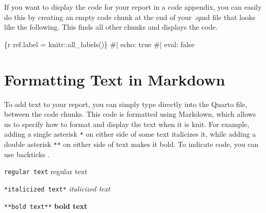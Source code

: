 \documentclass[
  letterpaper,
]{latex/krantz}
\makeatletter
\newenvironment{Shaded}{\begin{snugshade}}{\end{snugshade}}
\newcommand{\InformationTok}[1]{\textcolor[rgb]{0.37,0.37,0.37}{#1}}
\newenvironment{kframe}{%
\medskip{}
\setlength{\fboxsep}{.8em}
 \def\at@end@of@kframe{}%
 \ifinner\ifhmode%
  \def\at@end@of@kframe{\end{minipage}}%
  \begin{minipage}{\columnwidth}%
 \fi\fi%
 \def\FrameCommand##1{\hskip\@totalleftmargin \hskip-\fboxsep
 \colorbox{shadecolor}{##1}\hskip-\fboxsep
     \hskip-\linewidth \hskip-\@totalleftmargin \hskip\columnwidth}%
 \MakeFramed {\advance\hsize-\width
   \@totalleftmargin\z@ \linewidth\hsize
   \@setminipage}}%
 {\par\unskip\endMakeFramed%
 \at@end@of@kframe}
\renewenvironment{Shaded}{\begin{kframe}}{\end{kframe}}
\makeatother
\begin{document}
\begin{Shaded}
\end{Shaded}

If you want to display the code for your report in a code appendix, you
can easily do this by creating an empty code chunk at the end of your
.qmd file that looks like the following. This finds all other chunks and
displays the code.

\begin{Shaded}
\begin{Highlighting}[]
  \InformationTok{\textasciigrave{}\textasciigrave{}\textasciigrave{}\{r ref.label = knitr::all\_labels()\}}
\InformationTok{\#| echo: true}
\InformationTok{\#| eval: false}
\InformationTok{\textasciigrave{}\textasciigrave{}\textasciigrave{}}
\end{Highlighting}
\end{Shaded}

\section{\texorpdfstring{Formatting Text in Markdown
}{Formatting Text in Markdown }}\label{formatting-text-in-markdown}

To add text to your report, you can simply type directly into the Quarto
file, between the code chunks. This code is formatted using Markdown,
which allows us to specify how to format and display the text when it is
knit. For example, adding a single asterisk \texttt{*} on either side of
some text italicizes it, while adding a double asterisk \texttt{**} on
either side of text makes it bold. To indicate code, you can use
backticks \texttt{\textasciigrave{}}.

\newpage

\texttt{regular\ text} regular text

\texttt{*italicized\ text*} \emph{italicized text}

\texttt{**bold\ text**} \textbf{bold text}
\end{document}
